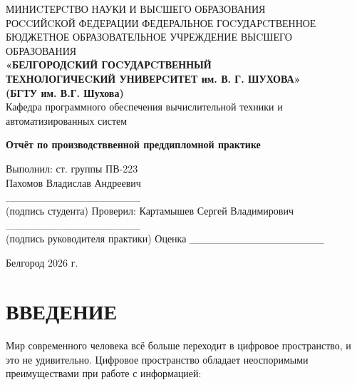 \documentclass[a4paper, 12pt, oneside]{article}
\newcommand\textbox[1]{
    \parbox{.45\textwidth}{#1}
}
\begin{document}
    \linespread{1.5}
    \setlength{\parskip}{0cm}


    \justifying
    \begin{center}
        \small{
            МИНИCТЕРCТВО НАУКИ И ВЫCШЕГО ОБРАЗОВАНИЯ \\РОCCИЙCКОЙ ФЕДЕРАЦИИ
            \bigbreak
            ФЕДЕРАЛЬНОЕ ГОCУДАРCТВЕННОЕ БЮДЖЕТНОЕ ОБРАЗОВАТЕЛЬНОЕ УЧРЕЖДЕНИЕ ВЫCШЕГО ОБРАЗОВАНИЯ \\
            \bigbreak
            \textbf{«БЕЛГОРОДCКИЙ ГОCУДАРCТВЕННЫЙ \\ТЕХНОЛОГИЧЕCКИЙ УНИВЕРCИТЕТ им. В. Г. ШУХОВА»\\ (БГТУ им. В.Г. Шухова)} \\
            \bigbreak
            Кафедра программного обеспечения вычислительной техники и автоматизированных систем\\}
    \end{center}

    \vfill
    \begin{center}
        \large{
            \textbf{
                Отчёт по производстввенной преддипломной практике}}\\
    \end{center}
    \vfill
    \hfill\textbox{
        Выполнил: ст. группы ПВ-223\\Пахомов Владислав Андреевич\\
        \_\_\_\_\_\_\_\_\_\_\_\_\_\_\_\_\_\_\\
        (подпись студента)
        \bigbreak
        Проверил: Картамышев Сергей Владимирович
        \_\_\_\_\_\_\_\_\_\_\_\_\_\_\_\_\_\_\\
        (подпись руководителя практики)
        \bigbreak
        Оценка \_\_\_\_\_\_\_\_\_\_\_\_\_\_\_\_\_\_
    }
    \vfill\begin{center}
              Белгород 2026 г.
    \end{center}
    \newpage
    \renewcommand{\contentsname}{Оглавление}
    \tableofcontents\newpage
    
\section{ВВЕДЕНИЕ}

Мир современного человека всё больше переходит в цифровое пространство, и это не удивительно.
Цифровое пространство обладает неоспоримыми преимуществами при работе с информацией:
\end{document}
